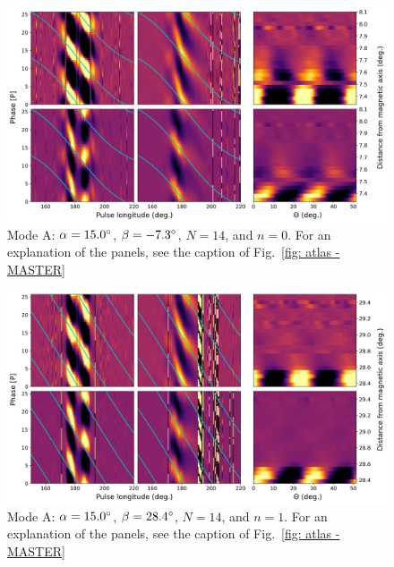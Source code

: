 \begin{figure}
	\begin{center}
		\includegraphics[width=\atlasHeightFrac\textwidth]{Figures/B0031/atlas/A_517015014000_plots}
		\caption[Atlas results: Mode A -- $\alpha=15.0\degr$, $\beta=-7.3\degr$, $N=14$, $n=0$]{Mode A: $\alpha=15.0\degr$, $\beta=-7.3\degr$, $N=14$, and $n=0$. For an explanation of the panels, see the caption of Fig.~\ref{fig: atlas - MASTER} }
		\label{fig: atlas - A_517015014000}
	\end{center}
\end{figure}

\begin{figure}
	\begin{center}
		\includegraphics[width=\atlasHeightFrac\textwidth]{Figures/B0031/atlas/A_517015014001_plots}
		\caption[Atlas results: Mode A -- $\alpha=15.0\degr$, $\beta=28.4\degr$, $N=14$, $n=1$]{Mode A: $\alpha=15.0\degr$, $\beta=28.4\degr$, $N=14$, and $n=1$. For an explanation of the panels, see the caption of Fig.~\ref{fig: atlas - MASTER} }
		\label{fig: atlas - A_517015014001}
	\end{center}
\end{figure}

